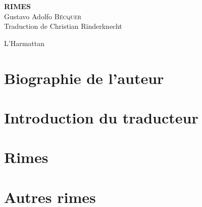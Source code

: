 \documentclass[a4paper,fontsize=13pt,twoside,final]{scrbook}
\begin{document}
\thispagestyle{empty}

\vspace*{70mm}

\begin{center}
{\Huge\textbf{RIMES}} \\
\bigskip
{\Large Gustavo Adolfo \textsc{Bécquer}} \\
\bigskip
Traduction de Christian Rinderknecht
\end{center}

\bigskip\bigskip\bigskip

\vfill
\begin{center}
L'Harmattan
\end{center}

\cleardoublepage


\part{Biographie de l'auteur}


\part{Introduction du traducteur}


\part{Rimes}


\part{Autres rimes}


\bigskip

\tableofcontents
\end{document}
